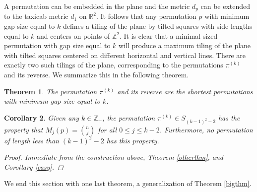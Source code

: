 \documentclass[11pt]{article}
\theoremstyle{plain}
\newtheorem{thm}{Theorem}
\newtheorem{cor}[thm]{Corollary}
\theoremstyle{definition}
\begin{document}
  A permutation can be embedded in the plane and the metric $d_p$ can be extended
  to the taxicab metric $d_1$ on $\mathbb{R}^2$. It follows that any permutation
  $p$ with minimum gap size equal to $k$ defines a tiling of the plane by tilted
  squares with side lengths equal to $k$ and centers on points of $\mathbb{Z}^2$.
  It is clear that a minimal sized permutation with gap size equal to $k$ will
  produce a maximum tiling of the plane with tilted squares centered on different
  horizontal and vertical lines. There are exactly two such tilings of the plane,
  corresponding to the permutations $\pi^{(k)}$ and its reverse. We summarize this
  in the following theorem.

  \begin{thm}
  The permutation $\pi^{(k)}$ and its reverse are the shortest permutations with
  minimum gap size equal to $k$.  
  \end{thm}

  \begin{cor}
  Given any $k\in \mathbb{Z}_+$, the permutation $\pi^{(k)} \in S_{(k-1)^2 -2}$ has
  the property that $M_j(p) = \binom{n}{j}$ for all $0\leq j \leq k-2$.
  Furthermore, no permutation of length less than $(k-1)^2 - 2$ has this property.
  \begin{proof}
  Immediate from the construction above, Theorem \ref{otherthm}, and Corollary
  \ref{easy}.  
  \end{proof}
  \end{cor}


  We end this section with one last theorem, a generalization of Theorem \ref{bigthm}.
\end{document}
